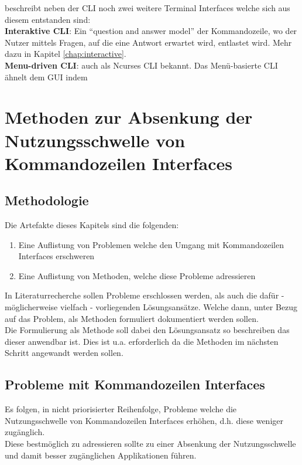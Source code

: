 \documentclass[oneside,bibliography=totocnumbered,BCOR=5mm]{scrbook}
\begin{document}
\cite{Spolsky_2001} beschreibt neben der CLI noch zwei weitere Terminal Interfaces welche sich aus diesem entstanden sind:
\\
\textbf{Interaktive CLI}: Ein ``question and answer model'' \parencite[42]{Spolsky_2001} der Kommandozeile, wo der Nutzer mittels Fragen, auf die eine Antwort erwartet wird, entlastet wird. Mehr dazu in Kapitel \ref{chap:interactive}.
\\
\textbf{Menu-driven CLI}: auch als Ncurses CLI bekannt. Das Menü-basierte CLI ähnelt dem GUI indem


\chapter{Methoden zur Absenkung der Nutzungsschwelle von Kommandozeilen Interfaces}

\section{Methodologie}

Die Artefakte dieses Kapitels sind die folgenden:
\begin{enumerate}
  \item Eine Auflistung von Problemen welche den Umgang mit Kommandozeilen Interfaces erschweren
  \item Eine Auflistung von Methoden, welche diese Probleme adressieren
\end{enumerate}

In Literaturrecherche sollen Probleme erschlossen werden, als auch die dafür -
möglicherweise vielfach - vorliegenden Lösungsansätze. Welche dann, unter Bezug
auf das Problem, als Methoden formuliert dokumentiert werden sollen.
\\
Die Formulierung als Methode soll dabei den Lösungsansatz so beschreiben das
dieser anwendbar ist. Dies ist u.a. erforderlich da die Methoden im nächsten
Schritt angewandt werden sollen.

\section{Probleme mit Kommandozeilen Interfaces}

Es folgen, in nicht priorisierter Reihenfolge, Probleme welche die
Nutzungsschwelle von Kommandozeilen Interfaces erhöhen, d.h. diese weniger
zugänglich.
\\
Diese bestmöglich zu adressieren sollte zu einer Absenkung der Nutzungsschwelle
und damit besser zugänglichen Applikationen führen.
\end{document}
